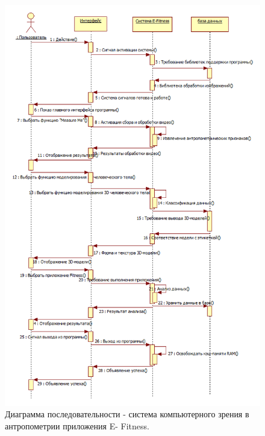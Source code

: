 \documentclass[10pt,pdf,hyperref={unicode},xcolor=table]{beamer}
\begin{document}
\begin{frame}{}
\begin{figure}[ht!]
\centering
\includegraphics[width=0.45\linewidth]{p18}
\begin{center}
\caption{Диаграмма последовательности - система компьютерного зрения в антропометрии приложения E- Fitness.}
\end{center}
\end{figure}
\end{frame}
\end{document}
